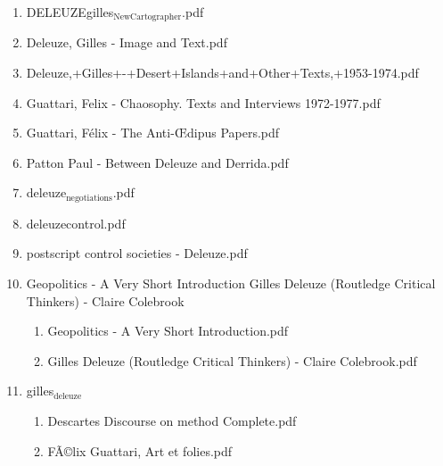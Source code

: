 \documentclass[11pt]{article}
\begin{document}
\begin{enumerate}
\begin{enumerate}
\begin{enumerate}
\item DELEUZEgilles$_{\text{NewCartographer}}$.pdf
\label{sec-1-1-1-1-11-29-19-23-47}

\item Deleuze, Gilles - Image and Text.pdf
\label{sec-1-1-1-1-11-29-19-23-48}

\item Deleuze,+Gilles+-+Desert+Islands+and+Other+Texts,+1953-1974.pdf
\label{sec-1-1-1-1-11-29-19-23-49}

\item Guattari, Felix - Chaosophy. Texts and Interviews 1972-1977.pdf
\label{sec-1-1-1-1-11-29-19-23-50}

\item Guattari, Félix - The Anti-Œdipus Papers.pdf
\label{sec-1-1-1-1-11-29-19-23-51}

\item Patton Paul - Between Deleuze and Derrida.pdf
\label{sec-1-1-1-1-11-29-19-23-52}

\item deleuze$_{\text{negotiations}}$.pdf
\label{sec-1-1-1-1-11-29-19-23-53}

\item deleuzecontrol.pdf
\label{sec-1-1-1-1-11-29-19-23-54}

\item postscript control societies - Deleuze.pdf
\label{sec-1-1-1-1-11-29-19-23-55}

\item Geopolitics - A Very Short Introduction Gilles Deleuze (Routledge Critical Thinkers) - Claire Colebrook
\label{sec-1-1-1-1-11-29-19-23-56}
\begin{enumerate}
\item Geopolitics - A Very Short Introduction.pdf
\label{sec-1-1-1-1-11-29-19-23-56-1}

\item Gilles Deleuze (Routledge Critical Thinkers) - Claire Colebrook.pdf
\label{sec-1-1-1-1-11-29-19-23-56-2}
\end{enumerate}

\item gilles$_{\text{deleuze}}$
\label{sec-1-1-1-1-11-29-19-23-57}
\begin{enumerate}
\item Descartes  Discourse on method Complete.pdf
\label{sec-1-1-1-1-11-29-19-23-57-1}

\item FÃ©lix Guattari, Art et folies.pdf
\label{sec-1-1-1-1-11-29-19-23-57-2}


\end{enumerate}
\end{enumerate}
\end{enumerate}
\end{enumerate}
\end{document}
